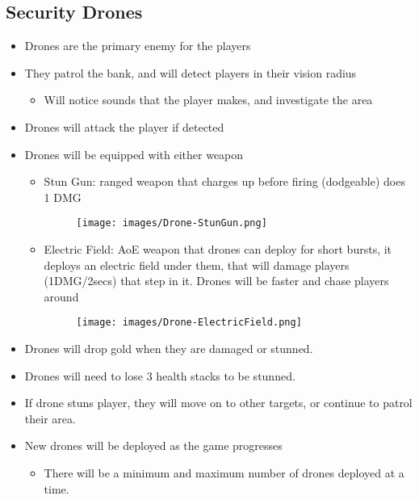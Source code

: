 \documentclass[10pt]{report}
\begin{document}
\subsection{Security Drones}

\begin{itemize}
    \item Drones are the primary enemy for the players
    \item They patrol the bank, and will detect players in their vision radius
    \begin{itemize}
        \item Will notice sounds that the player makes, and investigate the area 
    \end{itemize}
    \item Drones will attack the player if detected
    \item Drones will be equipped with either weapon                    
    \begin{itemize}
        \item Stun Gun: ranged weapon that charges up before firing (dodgeable) does 1 DMG
        \begin{figure}[H]
            \texttt{[image: images/Drone-StunGun.png]}
        \end{figure}
        \item Electric Field: AoE weapon that drones can deploy for short bursts, it deploys an electric field under them, that will damage  players (1DMG/2secs) that step in it. Drones will be faster and chase players around
        \begin{figure}[H]
            \texttt{[image: images/Drone-ElectricField.png]}
        \end{figure}
    \end{itemize}
    \item Drones will drop gold when they are damaged or stunned.
    \item Drones will need to lose 3 health stacks to be stunned.
    \item If drone stuns player, they will move on to other targets, or continue to patrol their area.
    \item New drones will be deployed as the game progresses
    \begin{itemize}
        \item There will be a minimum and maximum number of drones deployed at a time.
    \end{itemize}
\end{itemize}
\end{document}
